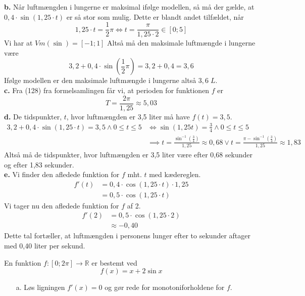 \documentclass{article}
\begin{document}
\noindent \textbf{b.} 
Når luftmængden i lungerne er maksimal ifølge modellen, så må der gælde, at $0,4\cdot \sin \left(1,25\cdot t\right) $ er så stor som mulig. 
Dette er blandt andet tilfældet, når 
\[
1,25 \cdot t=\frac{1}{2}\pi \iff t=\frac{\pi}{1,25\cdot 2} \in [0;5]
\] 
Vi har at $Vm(\sin)=[-1;1]$
Altså må den maksimale luftmængde i lungerne være
\[
3,2+0,4\cdot \sin \left(\frac{1}{2}\pi\right) =3,2+0,4=3,6
\] 
Ifølge modellen er den maksimale luftmængde i lungerne altså $3,6 \;\unit{L} $.\\[1ex]
\textbf{c.} Fra (128) fra formelsamlingen får vi, at perioden for funktionen $f$ er
\[
T=\frac{2\pi}{1,25}\approx5,03
\] 
\textbf{d.} De tidspunkter, $t$, hvor luftmængden er 3,5 liter må have $f(t)=3,5$.
\begin{equation*}
\begin{split}
  3,2+0,4\cdot \sin \left(1,25\cdot t\right) =3,5 \land 0\leq t \leq 5 &\iff \sin \left(1,25 t\right) =\frac{3}{4} \land 0\leq t \leq 5\\ 
  &\implies t=\frac{\sin^{-1}\left(\frac{3}{4}\right) }{1,25} \approx 0,68\lor t=\frac{\pi-\sin^{-1}\left(\frac{3}{4}\right)}{1,25} \approx 1,83
\end{split}
\end{equation*}
Altså må de tidspunkter, hvor luftmængden er 3,5 liter være efter 0,68 sekunder og efter 1,83 sekunder.\\[1ex]
\textbf{e.} 
Vi finder den afledede funktion for $f$ mht. $t$ med kædereglen. 
\begin{equation*}
\begin{split}
  f'(t)&=0,4\cdot \cos \left(1,25\cdot t\right) \cdot 1,25 \\ 
  &= 0,5 \cdot \cos \left(1,25\cdot t\right)
\end{split}
\end{equation*}
Vi tager nu den afledede funktion for $f$ af 2. 
\begin{equation*}
\begin{split}
  f'(2)&=0,5 \cdot \cos \left(1,25\cdot 2\right) \\
  &\approx -0,40
\end{split}
\end{equation*}
Dette tal fortæller, at luftmængden i personens lunger efter to sekunder aftager med 0,40 liter per sekund.
\begin{question}{}{}
  En funktion $f:[0;2\pi]\to \mathbb{R}$ er bestemt ved
  \[
  f(x)= x+2\sin x
  \] 
  \begin{itemize}
    \item[a.] Løs ligningen $f'(x)=0$ og gør rede for monotoniforholdene for $f$. 
  \end{itemize}
\end{question}
\end{document}

